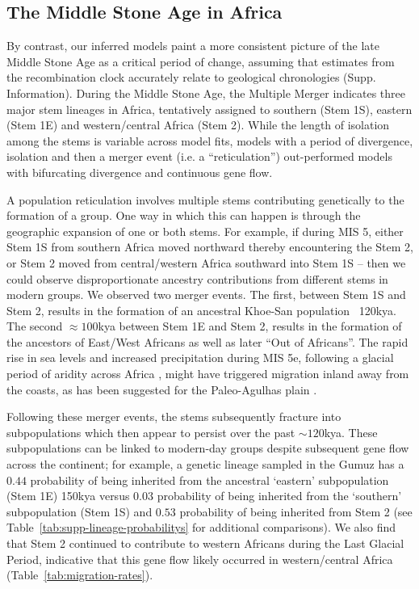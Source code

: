 \documentclass[]{article}
\begin{document}
\subsection*{The Middle Stone Age in Africa}

By contrast, our inferred models paint a more consistent picture of the late
Middle Stone Age as a critical period of change, assuming that estimates from
the recombination clock accurately relate to geological chronologies
(Supp. Information).
During the Middle Stone Age, the Multiple Merger indicates three
major stem lineages in Africa, tentatively assigned to southern (Stem 1S),
eastern (Stem 1E) and western/central Africa (Stem 2). While the length of
isolation among the stems is variable across model fits, models with a period of 
divergence, isolation and then a merger event (i.e. a ``reticulation'')
out-performed models with bifurcating divergence and continuous gene flow. 

A population reticulation involves multiple stems contributing genetically to
the formation of a group. One way in which this can happen is through the
geographic expansion of one or both stems. For example, if during MIS 5, either
Stem 1S from southern Africa moved northward thereby encountering the Stem 2,
or Stem 2 moved from central/western Africa southward into Stem 1S -- then we
could observe disproportionate ancestry contributions from different stems in
modern groups. We observed two merger events. The first, between Stem 1S and
Stem 2, results in the formation of an ancestral Khoe-San population ~120kya.
The second $\approx100$kya between Stem 1E and Stem 2, results in the formation of the
ancestors of East/West Africans as well as later ``Out of Africans''. The rapid
rise in sea levels and increased precipitation during MIS 5e, following a
glacial period of aridity across Africa \citep{Blome2012-lw}, might have
triggered migration inland away from the coasts, as has been suggested for the
Paleo-Agulhas plain \citep{Marean2014-pg}. 

Following these merger events, the stems subsequently fracture into
subpopulations which then appear to persist over the past $\sim120$kya. These
subpopulations can be linked to modern-day groups despite subsequent gene flow
across the continent; for example, a genetic lineage sampled in the Gumuz has a
$0.44$ probability of being inherited from the ancestral ‘eastern’ subpopulation
(Stem 1E) 150kya versus $0.03$ probability of being inherited from the ‘southern’
subpopulation (Stem 1S) and $0.53$ probability of being inherited from Stem 2
(see Table~\ref{tab:supp-lineage-probabilitys} for additional comparisons). We also
find that Stem 2 continued to contribute to western Africans during the Last
Glacial Period, indicative that this gene flow likely occurred in
western/central Africa (Table~\ref{tab:migration-rates}). 
\end{document}
